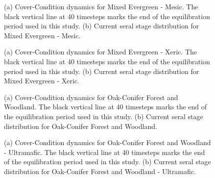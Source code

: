 \begin{figure}[!htbp]
  \centering
  \caption{(a) Cover-Condition dynamics for Mixed Evergreen - Mesic. The black vertical line at 40 timesteps marks the end of the equilibration period used in this study. (b) Current seral stage distribution for Mixed Evergreen - Mesic.}
\label{fig:covcond_megm}
\end{figure}


\begin{figure}[!htbp]
  \centering
  \caption{(a) Cover-Condition dynamics for Mixed Evergreen - Xeric. The black vertical line at 40 timesteps marks the end of the equilibration period used in this study. (b) Current seral stage distribution for Mixed Evergreen - Xeric.} 
  \label{fig:covcond_megx}
\end{figure}

\begin{figure}[!htbp]
  \centering
  \caption{(a) Cover-Condition dynamics for Oak-Conifer Forest and Woodland. The black vertical line at 40 timesteps marks the end of the equilibration period used in this study. (b) Current seral stage distribution for Oak-Conifer Forest and Woodland.} 
  \label{fig:covcond_ocfw}
\end{figure}

\begin{figure}[!htbp]
  \centering
  \caption{(a) Cover-Condition dynamics for Oak-Conifer Forest and Woodland - Ultramafic. The black vertical line at 40 timesteps marks the end of the equilibration period used in this study. (b) Current seral stage distribution for Oak-Conifer Forest and Woodland - Ultramafic.} 
  \label{fig:covcond_ocfwu}
\end{figure}

